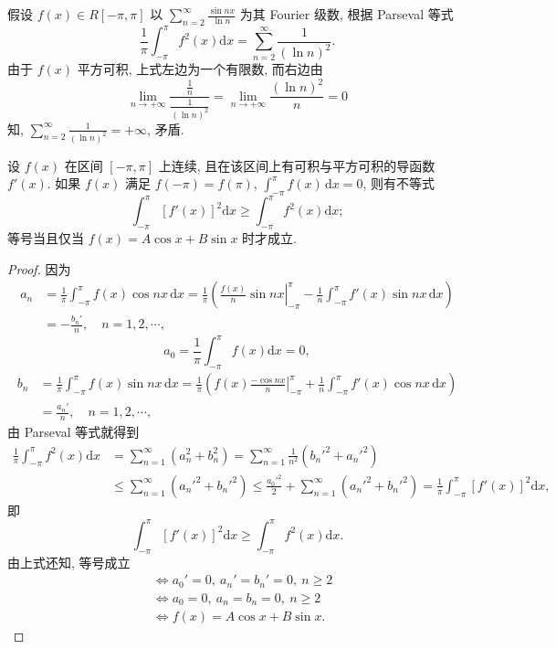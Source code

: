 \begin{solution}[证法 2]
[反证] 假设 $f(x) \in R[-\pi, \pi]$ 以 $\sum_{n=2}^{\infty} \frac{\sin nx}{\ln n}$ 为其 Fourier 级数, 根据 Parseval 等式
\[
  \frac{1}{\pi}\int_{-\pi}^{\pi}f^{2}(x)\mathrm{d}x=\sum_{n=2}^{\infty}\frac{1}{(\ln n)^{2}}.
\]
由于 $f(x)$ 平方可积, 上式左边为一个有限数, 而右边由
\[
  \lim_{n\to+\infty}\frac{\frac{1}{n}}{\frac{1}{(\ln n)^{2}}}=\lim_{n\to+\infty}\frac{(\ln n)^{2}}{n}=0
\]
知, $\sum_{n=2}^{\infty}\frac{1}{(\ln n)^{2}}=+\infty$, 矛盾.
\end{solution}

\begin{example}\label{ex:16.2.4}
设 $f(x)$ 在区间 $[-\pi, \pi]$ 上连续, 且在该区间上有可积与平方可积的导函数 $f'(x)$. 如果 $f(x)$ 满足 $f(-\pi) = f(\pi)$, $\int_{-\pi}^{\pi} f(x) \, \mathrm{d}x = 0$, 则有不等式
\[
  \int_{-\pi}^{\pi}\left[f'(x)\right]^{2}\mathrm{d}x\geqslant\int_{-\pi}^{\pi}f^{2}(x)\mathrm{d}x;
\]
等号当且仅当 $f(x)=A\cos x+B\sin x$ 时才成立.
\end{example}

\begin{proof}
因为
\[
  \begin{aligned}
    a_{n}&=\frac{1}{\pi}\int_{-\pi}^{\pi}f(x)\cos nx \,\mathrm{d}x=\frac{1}{\pi}\left(\left.\frac{f(x)}{n}\sin nx\right|_{-\pi}^{\pi}-\frac{1}{n}\int_{-\pi}^{\pi}f'(x)\sin nx \,\mathrm{d}x\right)\\
    &=-\frac{b_{n}'}{n},\quad n=1,2,\cdots,
  \end{aligned}
\]
\[
  a_{0}=\frac{1}{\pi}\int_{-\pi}^{\pi}f(x)\mathrm{d}x=0,
\]
\[
  \begin{aligned}
    b_{n}&=\frac{1}{\pi}\int_{-\pi}^{\pi}f(x)\sin n x\,\mathrm{d}x=\frac{1}{\pi}\left(\left.f(x)\frac{-\cos n x}{n}\right|_{-\pi}^{\pi}+\frac{1}{n}\int_{-\pi}^{\pi}f'(x)\cos n x\,\mathrm{d}x\right)\\
    &=\frac{a_{n}'}{n},\quad n=1,2,\cdots,
  \end{aligned}
\]
由 Parseval 等式就得到
\[
  \begin{aligned}
    \frac{1}{\pi}\int_{-\pi}^{\pi}f^{2}(x)\mathrm{d}x&=\sum_{n=1}^{\infty}\left(a_{n}^{2}+b_{n}^{2}\right)=\sum_{n=1}^{\infty}\frac{1}{n^{2}}\left(b_{n}'^{2}+a_{n}'^{2}\right)\\
    &\leqslant\sum_{n=1}^{\infty}\left(a_{n}'^{2}+b_{n}'^{2}\right)\leqslant\frac{a_{0}'^{2}}{2}+\sum_{n=1}^{\infty}\left(a_{n}'^{2}+b_{n}'^{2}\right)=\frac{1}{\pi}\int_{-\pi}^{\pi}\left[f'(x)\right]^{2}\mathrm{d}x,
  \end{aligned}
\]
即
\[
  \int_{-\pi}^{\pi}\left[f'(x)\right]^{2}\mathrm{d}x\geqslant\int_{-\pi}^{\pi}f^{2}(x)\mathrm{d}x.
\]
由上式还知, 等号成立
\[
  \begin{aligned}
    &\iff a_{0}'=0,\ a_{n}'=b_{n}'=0,\ n\geqslant2\\
    &\iff a_{0}=0,\ a_{n}=b_{n}=0,\ n\geqslant2\\
    &\iff f(x)=A\cos x+B\sin x.
  \end{aligned}
\]
\end{proof}

